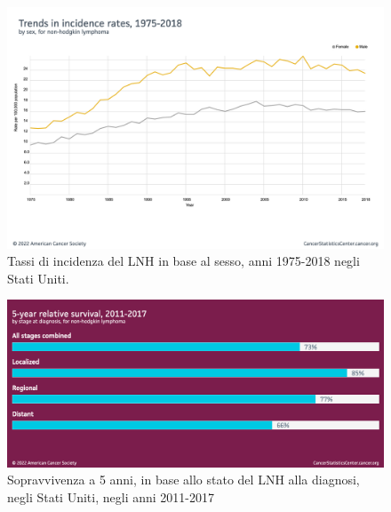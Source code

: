 \begin{figure}[H]
    \begin{center}
    \includegraphics[width=0.8\columnwidth]{img/Incidencerates1975-2018.png}
    \end{center}
    \caption[Tassi di incidenza del LNH in base al sesso, anni 1975-2018 negli Stati Uniti.]{Tassi di incidenza del LNH in base al sesso, anni 1975-2018 negli Stati Uniti.
    \cite{img12}}

\end{figure}

\begin{figure}[H]
    \begin{center}
    \includegraphics[width=0.7\columnwidth]{img/5-yearrelativesurvival2011-2017.png}
    \end{center}
    \caption[Sopravvivenza a 5 anni, in base allo stato del LNH alla diagnosi, negli Stati Uniti, negli anni 2011-2017]{Sopravvivenza a 5 anni, in base allo stato del LNH alla diagnosi, negli Stati Uniti, negli anni 2011-2017
    \cite{img13}}

\end{figure}

